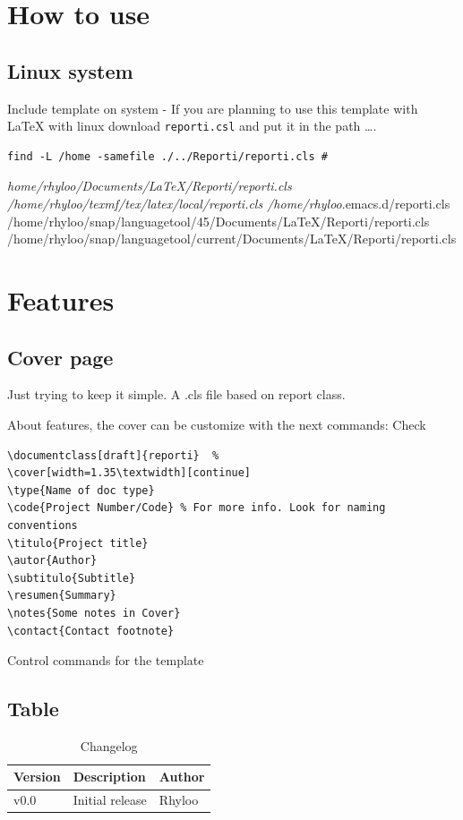 \documentclass[english]{reporti}
\begin{document}
\section{How to use}
\label{sec:orga1b60c4}
\subsection{Linux system}
\label{sec:org3442214}
Include template on system - If you are planning to use this template with \LaTeX{} with linux download \texttt{reporti.csl} and put it in the path \ldots{}.

\begin{verbatim}
find -L /home -samefile ./../Reporti/reporti.cls # 
\end{verbatim}

\emph{home/rhyloo/Documents/\LaTeX{}/Reporti/reporti.cls
/home/rhyloo/texmf/tex/latex/local/reporti.cls
/home/rhyloo}.emacs.d/reporti.cls
/home/rhyloo/snap/languagetool/45/Documents/\LaTeX{}/Reporti/reporti.cls
/home/rhyloo/snap/languagetool/current/Documents/\LaTeX{}/Reporti/reporti.cls
\section{Features}
\label{sec:org9b247ea}
\subsection{Cover page}
\label{sec:org0c7ca08}
Just trying to keep it simple. A .cls file based on report class.

About features, the cover can be customize with the next commands: Check 

\begin{listing}[htbp]
\begin{verbatim}
\documentclass[draft]{reporti}  %
\cover[width=1.35\textwidth][continue]
\type{Name of doc type}
\code{Project Number/Code} % For more info. Look for naming conventions
\titulo{Project title} 
\autor{Author}
\subtitulo{Subtitle}
\resumen{Summary}
\notes{Some notes in Cover}
\contact{Contact footnote}
\end{verbatim}
\caption{Control commands for the template}
\end{listing}

\subsection{Table}
\label{sec:org1736309}
\begin{table}[H]
\caption{Changelog}
\centering
\begin{tabular}{lll}
\hline
Version & Description & Author\\[0pt]
\hline
v0.0 & Initial release & Rhyloo\\[0pt]
\hline
\end{tabular}
\end{table}
\end{document}
